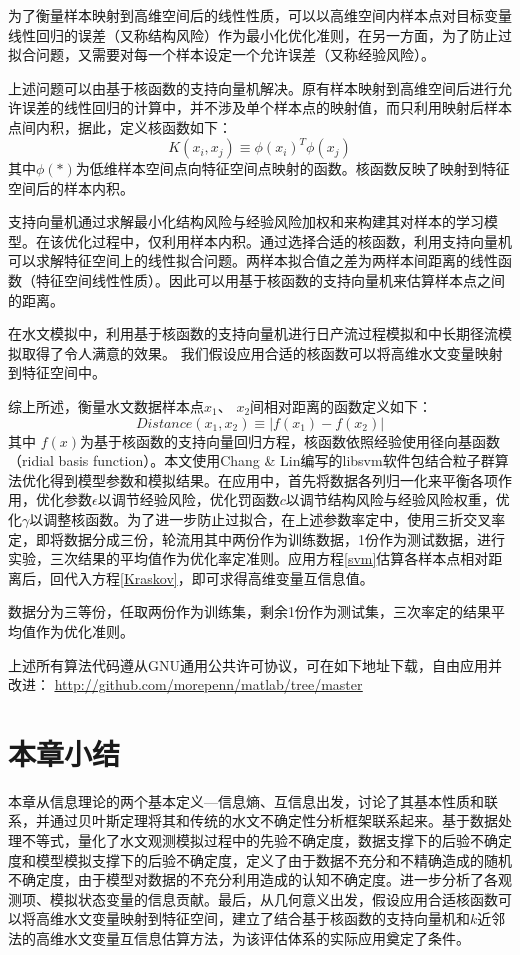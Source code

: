 为了衡量样本映射到高维空间后的线性性质，可以以高维空间内样本点对目标变量线性回归的误差（又称结构风险）作为最小化优化准则，在另一方面，为了防止过拟合问题，又需要对每一个样本设定一个允许误差（又称经验风险）。

上述问题可以由基于核函数的支持向量机解决。原有样本映射到高维空间后进行允许误差的线性回归的计算中，并不涉及单个样本点的映射值，而只利用映射后样本点间内积，据此，定义核函数如下：
\begin{equation}
K(x_i,x_j)\equiv\phi(x_i)^{T}\phi(x_j)
\end{equation}
其中$\phi(*)$为低维样本空间点向特征空间点映射的函数。核函数反映了映射到特征空间后的样本内积。

支持向量机通过求解最小化结构风险与经验风险加权和来构建其对样本的学习模型。在该优化过程中，仅利用样本内积。通过选择合适的核函数，利用支持向量机可以求解特征空间上的线性拟合问题。两样本拟合值之差为两样本间距离的线性函数（特征空间线性性质）。因此可以用基于核函数的支持向量机来估算样本点之间的距离。

在水文模拟中，利用基于核函数的支持向量机进行日产流过程模拟\cite{dibike2001model, behzad2009generalization,phdgong}和中长期径流模拟\cite{lin2006using}取得了令人满意的效果。 我们假设应用合适的核函数可以将高维水文变量映射到特征空间中。

综上所述，衡量水文数据样本点$x_1$、 $x_2$间相对距离的函数定义如下：
\begin{equation}\label{svm}
Distance(x_1,x_2)\equiv|f(x_1)-f(x_2)|
\end{equation}
其中 $f(x)$为基于核函数的支持向量回归方程，核函数依照经验使用径向基函数（ridial basis function）。本文使用Chang \& Lin\citep{chang2011libsvm}编写的libsvm软件包结合粒子群算法\cite{shi1998modified}优化得到模型参数和模拟结果。在应用中，首先将数据各列归一化来平衡各项作用，优化参数$\epsilon$以调节经验风险，优化罚函数$c$以调节结构风险与经验风险权重，优化$\gamma$以调整核函数。为了进一步防止过拟合，在上述参数率定中，使用三折交叉率定，即将数据分成三份，轮流用其中两份作为训练数据，1份作为测试数据，进行实验，三次结果的平均值作为优化率定准则。应用方程\ref{svm}估算各样本点相对距离后，回代入方程\ref{Kraskov}，即可求得高维变量互信息值。
 
数据分为三等份，任取两份作为训练集，剩余1份作为测试集，三次率定的结果平均值作为优化准则。


上述所有算法代码遵从GNU通用公共许可协议，可在如下地址下载，自由应用并改进：
{\href{http://github.com/morepenn/matlab/tree/master}
{\underline
{http://github.com/morepenn/matlab/tree/master}}}
\section{本章小结}
本章从信息理论的两个基本定义---信息熵、互信息出发，讨论了其基本性质和联系，并通过贝叶斯定理将其和传统的水文不确定性分析框架联系起来。基于数据处理不等式，量化了水文观测模拟过程中的先验不确定度，数据支撑下的后验不确定度和模型模拟支撑下的后验不确定度，定义了由于数据不充分和不精确造成的随机不确定度，由于模型对数据的不充分利用造成的认知不确定度。进一步分析了各观测项、模拟状态变量的信息贡献。最后，从几何意义出发，假设应用合适核函数可以将高维水文变量映射到特征空间，建立了结合基于核函数的支持向量机和$k$近邻法的高维水文变量互信息估算方法，为该评估体系的实际应用奠定了条件。




